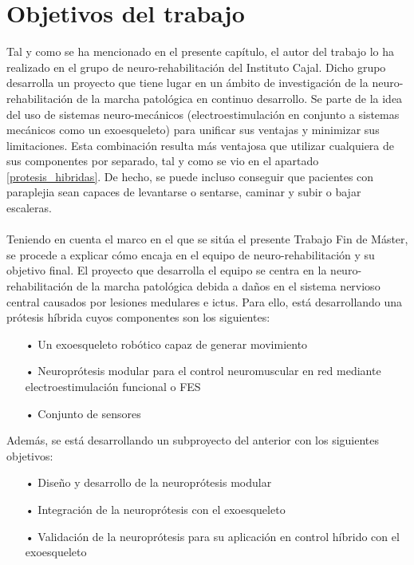 \section{Objetivos del trabajo}
Tal y como se ha mencionado en el presente capítulo, el autor del trabajo lo ha realizado en el grupo de neuro-rehabilitación del Instituto Cajal. Dicho grupo desarrolla un proyecto que tiene lugar en un ámbito de investigación de la neuro-rehabilitación de la marcha patológica en continuo desarrollo. Se parte de la idea del uso de sistemas neuro-mecánicos (electroestimulación en conjunto a sistemas mecánicos como un exoesqueleto) para unificar sus ventajas y minimizar sus limitaciones. Esta combinación resulta más ventajosa que utilizar cualquiera de sus componentes por separado, tal y como se vio en el apartado \ref{protesis_hibridas}. De hecho, se puede incluso conseguir que pacientes con paraplejia sean capaces de levantarse o sentarse, caminar y subir o bajar escaleras.
\\
\\
Teniendo en cuenta el marco en el que se sitúa el presente Trabajo Fin de Máster, se procede a explicar cómo encaja en el equipo de neuro-rehabilitación y su objetivo final. El proyecto que desarrolla el equipo se centra en la neuro-rehabilitación de la marcha patológica debida a daños en el sistema nervioso central causados por lesiones medulares e ictus\cite{tesis_antonio}. Para ello, está desarrollando una prótesis híbrida cuyos componentes son los siguientes:

\begin{itemize}
\item[•] Un exoesqueleto robótico capaz de generar movimiento
\item[•] Neuroprótesis modular para el control neuromuscular en red mediante electroestimulación funcional o FES
\item[•] Conjunto de sensores 
\end{itemize}

Además, se está desarrollando un subproyecto del anterior con los siguientes objetivos:
\begin{itemize}
\item[•] Diseño y desarrollo de la neuroprótesis modular
\item[•] Integración de la neuroprótesis con el exoesqueleto 
\item[•] Validación de la neuroprótesis para su aplicación en control híbrido con el exoesqueleto
\end{itemize}

